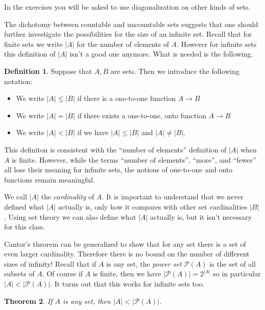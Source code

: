 \documentclass[11pt,oneside]{amsbook}
\theoremstyle{definition}
\theoremstyle{plain}
\newtheorem{theorem}{Theorem}[section]
\theoremstyle{definition}
\newtheorem{definition}[theorem]{Definition}
\theoremstyle{remark}
\numberwithin{equation}{section}
\numberwithin{figure}{section}
\begin{document}
In the exercises you will be asked to use diagonalization on other kinds of sets.

The dichotomy between countable and uncountable sets suggests that one should further investigate the possibilities for the size of an infinite set. Recall that for finite sets we write $|A|$ for the number of elements of $A$. However for infinite sets this definition of $|A|$ isn't a good one anymore. What is needed is the following.

\begin{definition}
  Suppose that $A,B$ are sets. Then we introduce the following notation:
  \begin{itemize}
  \item We write $|A|\leq|B|$ if there is a one-to-one function $A\to B$
  \item We write $|A|=|B|$ if there exists a one-to-one, onto function $A\to B$
  \item We write $|A|<|B|$ if we have $|A|\leq|B|$ and $|A|\neq|B|$.
  \end{itemize}
\end{definition}

This definiton is consistent with the ``number of elements'' definition of $|A|$ when $A$ is finite. However, while the terms ``number of elements'', ``more'', and ``fewer'' all lose their meaning for infinite sets, the notions of one-to-one and onto functions remain meaningful.

We call $|A|$ the \emph{cardinality} of $A$. It is important to understand that we never defined what $|A|$ actually is, only how it compares with other set cardinalities $|B|$. Using set theory we can also define what $|A|$ actually is, but it isn't necessary for this class.

Cantor's theorem can be generalized to show that for any set there is a set of even larger cardinality. Therefore there is no bound on the number of different sizes of infinity! Recall that if $A$ is any set, the \emph{power set} $\mathcal P(A)$ is the set of all subsets of $A$. Of course if $A$ is finite, then we have $|\mathcal P(A)|=2^{|A|}$ so in particular $|A|<|\mathcal P(A)|$. It turns out that this works for infinite sets too.

\begin{theorem}
  If $A$ is any set, then $|A|<|\mathcal P(A)|$.
\end{theorem}
\end{document}
